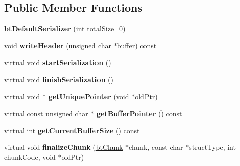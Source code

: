 \subsection*{Public Member Functions}
\begin{DoxyCompactItemize}
\item 
\mbox{\label{classbtDefaultSerializer_a1c9914bdda6a6ca27be61adb8b44acb5}} 
{\bfseries bt\+Default\+Serializer} (int total\+Size=0)
\item 
\mbox{\label{classbtDefaultSerializer_ac5beeb200647073e6c48a2bce4bf7427}} 
void {\bfseries write\+Header} (unsigned char $\ast$buffer) const
\item 
\mbox{\label{classbtDefaultSerializer_a4baf73f945f39b82b7a63482e51704ca}} 
virtual void {\bfseries start\+Serialization} ()
\item 
\mbox{\label{classbtDefaultSerializer_aaf3755dc93e87cfd9b25103ce81ff452}} 
virtual void {\bfseries finish\+Serialization} ()
\item 
\mbox{\label{classbtDefaultSerializer_a523b964568de9613eb3325583338c55b}} 
virtual void $\ast$ {\bfseries get\+Unique\+Pointer} (void $\ast$old\+Ptr)
\item 
\mbox{\label{classbtDefaultSerializer_a05e00aa176a4898b4099962e0374a4f1}} 
virtual const unsigned char $\ast$ {\bfseries get\+Buffer\+Pointer} () const
\item 
\mbox{\label{classbtDefaultSerializer_a8419c7a7a73b90c152557a943f056506}} 
virtual int {\bfseries get\+Current\+Buffer\+Size} () const
\item 
\mbox{\label{classbtDefaultSerializer_a885c6fa611ad8ccb923af7a3fa7c6e93}} 
virtual void {\bfseries finalize\+Chunk} (\hyperlink{classbtChunk}{bt\+Chunk} $\ast$chunk, const char $\ast$struct\+Type, int chunk\+Code, void $\ast$old\+Ptr)
\item 
\mbox{\label{classbtDefaultSerializer_ac0280f12b9476be3e60e1dd9ff21d5e2}} 

\end{DoxyCompactItemize}
